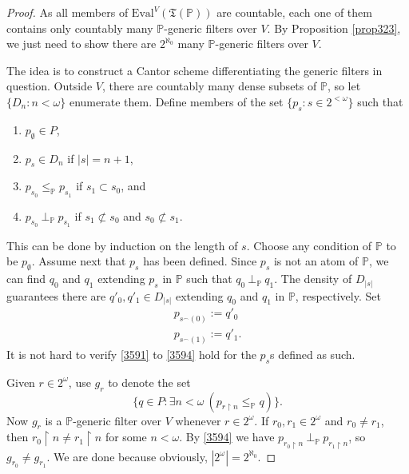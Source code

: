 \documentclass[12pt, twoside]{memoir}
\numberwithin{equation}{section}
\theoremstyle{definition}
\theoremstyle{remark}
\theoremstyle{definition}
\theoremstyle{definition}
\theoremstyle{definition}
\theoremstyle{remark}
\begin{document}
\begin{proof}
As all members of $\mathrm{Eval}^V(\mathfrak{T}(\mathbb{P}))$ are countable, each one of them contains only countably many $\mathbb{P}$-generic filters over $V$. By Proposition \ref{prop323}, we just need to show there are $2^{\aleph_0}$ many $\mathbb{P}$-generic filters over $V$. 

The idea is to construct a Cantor scheme differentiating the generic filters in question. Outside $V$, there are countably many dense subsets of $\mathbb{P}$, so let $\{D_n : n < \omega\}$ enumerate them. Define members of the set $\{p_s : s \in 2^{< \omega}\}$ such that
\begin{enumerate}[label=(\arabic*)]
    \item\label{3591} $p_{\emptyset} \in P$,
    \item $p_s \in D_n$ if $|s| = n + 1$,
    \item $p_{s_0} \leq_{\mathbb{P}} p_{s_1}$ if $s_1 \subset s_0$, and
    \item\label{3594} $p_{s_0} \ \bot_{\mathbb{P}} \ p_{s_1}$ if $s_1 \not\subset s_0$ and $s_0 \not\subset s_1$.
\end{enumerate}
This can be done by induction on the length of $s$. Choose any condition of $\mathbb{P}$ to be $p_{\emptyset}$. Assume next that $p_s$ has been defined. Since $p_s$ is not an atom of $\mathbb{P}$, we can find $q_0$ and $q_1$ extending $p_s$ in $\mathbb{P}$ such that $q_0 \ \bot_{\mathbb{P}} \ q_1$. The density of $D_{|s|}$ guarantees there are $q'_0, q'_1 \in D_{|s|}$ extending $q_0$ and $q_1$ in $\mathbb{P}$, respectively. Set
\begin{gather*}
    p_{s^\frown (0)} := q'_0 \\
    p_{s^\frown (1)} := q'_1 \text{.}
\end{gather*}
It is not hard to verify \ref{3591} to \ref{3594} hold for the $p_s$s defined as such.

Given $r \in 2^{\omega}$, use $g_r$ to denote the set
\begin{equation*}
    \{q \in P : \exists n < \omega \ (p_{r \restriction n} \leq_{\mathbb{P}} q)\} \text{.}
\end{equation*}
Now $g_r$ is a $\mathbb{P}$-generic filter over $V$ whenever $r \in 2^{\omega}$. If $r_0, r_1 \in 2^{\omega}$ and $r_0 \neq r_1$, then $r_0 \restriction n \neq r_1 \restriction n$ for some $n < \omega$. By \ref{3594} we have $p_{r_0 \restriction n} \ \bot_{\mathbb{P}} \ p_{r_1 \restriction n}$, so $g_{r_0} \neq g_{r_1}$. We are done because obviously, $|2^{\omega}| = 2^{\aleph_0}$.
\end{proof}
\end{document}
